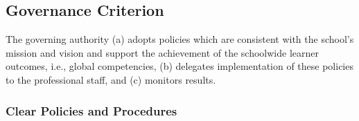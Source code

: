 
\subsection{Governance Criterion}

The governing authority (a) adopts policies which are consistent with the school’s mission and vision and support the achievement of the schoolwide learner outcomes, i.e., global competencies, (b) delegates implementation of these policies to the professional staff, and (c) monitors results.

\subsubsection{Clear Policies and Procedures}



